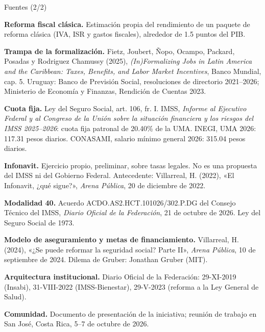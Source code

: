 \begin{frame}{Fuentes (2/2)}
  \vspace{0.2em}
  {\fontsize{6.6}{8.4}\selectfont\raggedright
  \textbf{Reforma fiscal clásica.} Estimación propia del rendimiento de un paquete de reforma clásica (IVA, ISR y gastos fiscales), alrededor de 1.5 puntos del PIB.\par\vspace{0.6em}
  \textbf{Trampa de la formalización.} Fietz, Joubert, Ñopo, Ocampo, Packard, Posadas y Rodriguez Chamussy (2025), \emph{(In)Formalizing Jobs in Latin America and the Caribbean: Taxes, Benefits, and Labor Market Incentives}, Banco Mundial, cap. 5. Uruguay: Banco de Previsión Social, resoluciones de directorio 2021--2026; Ministerio de Economía y Finanzas, Rendición de Cuentas 2023.\par\vspace{0.6em}
  \textbf{Cuota fija.} Ley del Seguro Social, art. 106, fr. I. IMSS, \emph{Informe al Ejecutivo Federal y al Congreso de la Unión sobre la situación financiera y los riesgos del IMSS 2025--2026}: cuota fija patronal de 20.40\% de la UMA. INEGI, UMA 2026: 117.31 pesos diarios. CONASAMI, salario mínimo general 2026: 315.04 pesos diarios.\par\vspace{0.6em}
  \textbf{Infonavit.} Ejercicio propio, preliminar, sobre tasas legales. No es una propuesta del IMSS ni del Gobierno Federal. Antecedente: Villarreal, H. (2022), «El Infonavit, ¿qué sigue?», \emph{Arena Pública}, 20 de diciembre de 2022.\par\vspace{0.6em}
  \textbf{Modalidad 40.} Acuerdo ACDO.AS2.HCT.101026/302.P.DG del Consejo Técnico del IMSS, \emph{Diario Oficial de la Federación}, 21 de octubre de 2026. Ley del Seguro Social de 1973.\par\vspace{0.6em}
  \textbf{Modelo de aseguramiento y metas de financiamiento.} Villarreal, H. (2024), «¿Se puede reformar la seguridad social? Parte II», \emph{Arena Pública}, 10 de septiembre de 2024. Dilema de Gruber: Jonathan Gruber (MIT).\par\vspace{0.6em}
  \textbf{Arquitectura institucional.} Diario Oficial de la Federación: 29-XI-2019 (Insabi), 31-VIII-2022 (IMSS-Bienestar), 29-V-2023 (reforma a la Ley General de Salud).\par\vspace{0.6em}
  \textbf{Comunidad.} Documento de presentación de la iniciativa; reunión de trabajo en San José, Costa Rica, 5--7 de octubre de 2026.\par}
\end{frame}
